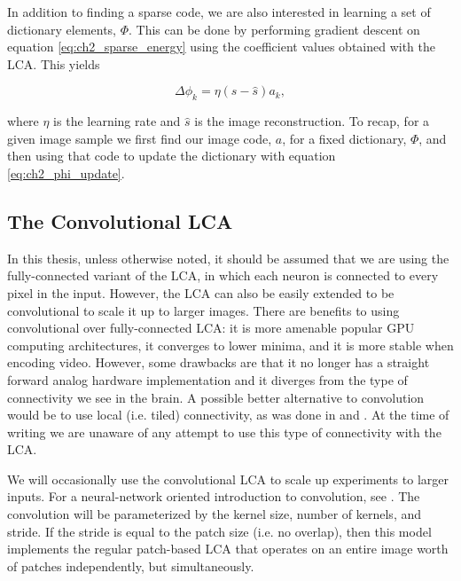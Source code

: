 In addition to finding a sparse code, we are also interested in learning a set of dictionary elements, $\Phi$. This can be done by performing gradient descent on equation \eqref{eq:ch2_sparse_energy} using the coefficient values obtained with the LCA. This yields

\begin{equation}\label{eq:ch2_phi_update}
    \Delta \phi_{k} = \eta (s - \hat{s}) a_{k},
\end{equation}

\noindent where $\eta$ is the learning rate and $\hat{s}$ is the image reconstruction. To recap, for a given image sample we first find our image code, $a$, for a fixed dictionary, $\Phi$, and then using that code to update the dictionary with equation \eqref{eq:ch2_phi_update}.


\subsection{The Convolutional LCA}
In this thesis, unless otherwise noted, it should be assumed that we are using the fully-connected variant of the LCA, in which each neuron is connected to every pixel in the input. However, the LCA can also be easily extended to be convolutional to scale it up to larger images. There are benefits to using convolutional over fully-connected LCA: it is more amenable popular GPU computing architectures, it converges to lower minima, and it is more stable when encoding video. However, some drawbacks are that it no longer has a straight forward analog hardware implementation and it diverges from the type of connectivity we see in the brain. A possible better alternative to convolution would be to use local (i.e. tiled) connectivity, as was done in \parencite{le2011building} and \parencite{ngiam2010tiled}. At the time of writing we are unaware of any attempt to use this type of connectivity with the LCA.

We will occasionally use the convolutional LCA to scale up experiments to larger inputs. For a neural-network oriented introduction to convolution, see \parencite{goodfellow2016deep}. The convolution will be parameterized by the kernel size, number of kernels, and stride. If the stride is equal to the patch size (i.e. no overlap), then this model implements the regular patch-based LCA that operates on an entire image worth of patches independently, but simultaneously.

